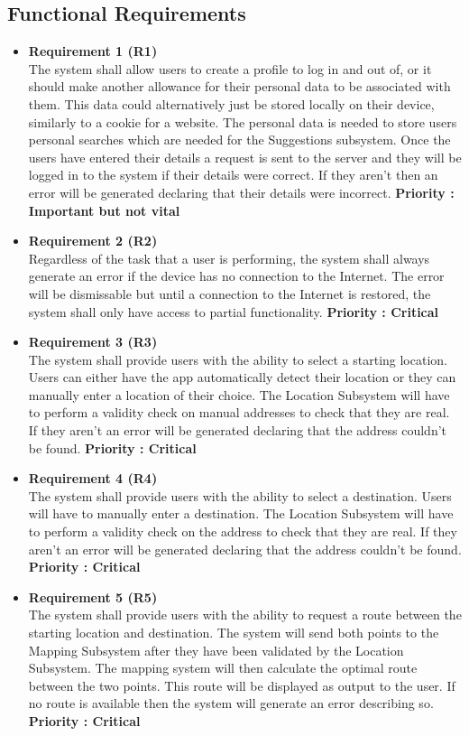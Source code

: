 \documentclass[english]{article}
\begin{document}
				\subsection{Functional Requirements}
					\begin{itemize}
					    \item \textbf{Requirement 1 (R1)}\\ The system shall allow users to create a profile to log in and out of, or it should make another allowance for their personal data to be associated with them. This data could alternatively just be stored locally on their device, similarly to a cookie for a website. The personal data is needed to store users personal searches which are needed for the Suggestions subsystem. Once the users have entered their details a request is sent to the server and they will be logged in to the system if their details were correct. If they aren't then an error will be generated declaring that their details were incorrect. \textbf{Priority : Important but not vital}
					    \item \textbf{Requirement 2 (R2)}\\ Regardless of the task that a user is performing, the system shall always generate an error if the device has no connection to the Internet. The error will be dismissable but until a connection to the Internet is restored, the system shall only have access to partial functionality. \textbf{Priority : Critical}
					    \item \textbf{Requirement 3 (R3)}\\ The system shall provide users with the ability to select a starting location. Users can either have the app automatically detect their location or they can manually enter a location of their choice. The Location Subsystem will have to perform a validity check on manual addresses to check that they are real. If they aren't an error will be generated declaring that the address couldn't be found. \textbf{Priority : Critical}
					    \item \textbf{Requirement 4 (R4)}\\ The system shall provide users with the ability to select a destination. Users will have to manually enter a destination. The Location Subsystem will have to perform a validity check on the address to check that they are real.  If they aren't an error will be generated declaring that the address couldn't be found.  \textbf{Priority : Critical}
					    \item \textbf{Requirement 5 (R5)}\\ The system shall provide users with the ability to request a route between the starting location and destination. The system will send both points to the Mapping Subsystem after they have been validated by the Location Subsystem. The mapping system will then calculate the optimal route between the two points. This route will be displayed as output to the user. If no route is available then the system will generate an error describing so. \textbf{Priority : Critical}

\end{itemize}
\end{document}
